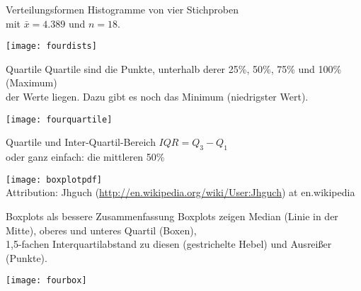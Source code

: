 \begin{frame}
  {Verteilungsformen}
  Histogramme von vier Stichproben\\
  mit $\bar{x}=4.389$ und $n=18$.
  \vspace{-0.5cm}
  \begin{center}
    \texttt{[image: fourdists]}
  \end{center}
\end{frame}

\begin{frame}
  {Quartile}
  Quartile sind die Punkte, unterhalb derer 25\%, 50\%, 75\% und 100\% (Maximum)\\
  der Werte liegen. Dazu gibt es noch das Minimum (niedrigster Wert).
  \vspace{-0.5cm}
  \begin{center}
    \texttt{[image: fourquartile]}
  \end{center}
\end{frame}


\begin{frame}
  {Quartile und Inter-Quartil-Bereich}
  \alert{$IQR = Q_3-Q_1$}\\
  oder ganz einfach: die mittleren 50\%\\
  \begin{center}
    \texttt{[image: boxplotpdf]}\\
    {\tiny Attribution: Jhguch (\url{http://en.wikipedia.org/wiki/User:Jhguch}) at en.wikipedia}
  \end{center}
\end{frame}


\begin{frame}
  {Boxplots als bessere Zusammenfassung}
  Boxplots zeigen Median (Linie in der Mitte), oberes und unteres Quartil (Boxen),\\
  1,5-fachen Interquartilabstand zu diesen (gestrichelte Hebel) und Ausreißer (Punkte).
  \vspace{-0.5cm}
  \begin{center}
    \texttt{[image: fourbox]}
  \end{center}
\end{frame}


